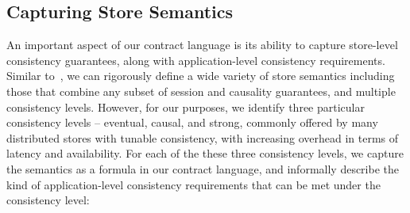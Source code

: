 \subsection{Capturing Store Semantics}

An important aspect of our contract language is its ability to capture
store-level consistency guarantees, along with application-level
consistency requirements. Similar to~\cite{Burckhardt2014}, we can
rigorously define a wide variety of store semantics including those
that combine any subset of session and causality guarantees, and
multiple consistency levels.  However, for our purposes, we identify
three particular consistency levels -- eventual, causal, and strong,
commonly offered by many distributed stores with tunable consistency,
with increasing overhead in terms of latency and availability. For
each of the these three consistency levels, we capture the semantics
as a formula in our contract language, and informally describe the kind
of application-level consistency requirements that can be met under the
consistency level:


